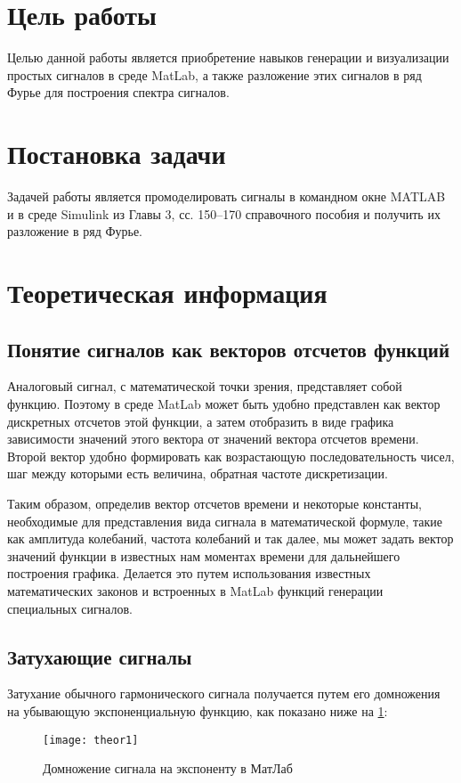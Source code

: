 







\section{Цель работы}
Целью данной работы является приобретение навыков генерации и визуализации простых сигналов в среде MatLab, а также разложение этих сигналов в ряд Фурье для построения спектра сигналов.

\section{Постановка задачи}
Задачей работы является промоделировать сигналы в командном окне MATLAB и в среде Simulink из Главы 3, сс. 150–170 справочного пособия и получить их разложение в ряд Фурье.

\section{Теоретическая информация}
\subsection{Понятие сигналов как векторов отсчетов функций}
Аналоговый сигнал, с математической точки зрения, представляет собой функцию. Поэтому в среде  MatLab может быть удобно представлен как вектор дискретных отсчетов этой функции, а затем отобразить в виде графика зависимости значений этого вектора от значений вектора отсчетов времени. Второй вектор удобно формировать как возрастающую последовательность чисел, шаг между которыми есть величина, обратная частоте дискретизации.

Таким образом, определив вектор отсчетов времени и некоторые константы, необходимые для представления вида сигнала в математической формуле, такие как амплитуда колебаний, частота колебаний и так далее, мы может задать вектор значений функции в известных нам моментах времени для дальнейшего построения графика. Делается это путем использования известных математических законов и встроенных в MatLab функций генерации специальных сигналов.

\subsection{Затухающие сигналы}
Затухание обычного гармонического сигнала получается путем его домножения на убывающую экспоненциальную функцию, как показано ниже на \ref{pic:theor1}:
\begin{figure}[H]
	\begin{center}
		\texttt{[image: theor1]}
		\caption{Домножение сигнала на экспоненту в МатЛаб} 
		\label{pic:theor1} %
	\end{center}
\end{figure}

